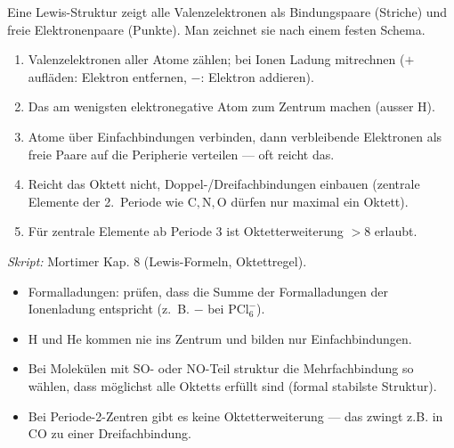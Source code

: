 
Eine Lewis-Struktur zeigt alle Valenzelektronen als Bindungspaare (Striche) und
freie Elektronenpaare (Punkte). Man zeichnet sie nach einem festen Schema.

\begin{werkzeugkasten}
\begin{enumerate}
  \item Valenzelektronen aller Atome zählen; bei Ionen Ladung mitrechnen
        ($+$ aufläden: Elektron entfernen, $-$: Elektron addieren).
  \item Das am wenigsten elektronegative Atom zum Zentrum machen (ausser H).
  \item Atome über Einfachbindungen verbinden, dann verbleibende Elektronen als
        freie Paare auf die Peripherie verteilen --- oft reicht das.
  \item        Reicht das Oktett nicht, Doppel-/Dreifachbindungen einbauen (zentrale
        Elemente der 2.\ Periode wie $\mathrm{C,N,O}$ dürfen nur maximal ein Oktett).
  \item Für zentrale Elemente ab Periode 3 ist Oktetterweiterung $>8$ erlaubt.
\end{enumerate}
\textit{Skript:} Mortimer Kap. 8 (Lewis-Formeln, Oktettregel).
\end{werkzeugkasten}

\begin{achtung}
\begin{itemize}
  \item Formalladungen: prüfen, dass die Summe der Formalladungen der
        Ionenladung entspricht (z.\ B. $\mathrm{-}$ bei $\mathrm{PCl_6^-}$).
  \item H und He kommen nie ins Zentrum und bilden nur Einfachbindungen.
  \item Bei Molekülen mit $\mathrm{SO}$- oder $\mathrm{NO}$-Teil struktur die
        Mehrfachbindung so wählen, dass möglichst alle Oktetts erfüllt sind
        (formal stabilste Struktur).
  \item Bei Periode-2-Zentren gibt es keine Oktetterweiterung --- das zwingt z.B.
        in $\mathrm{CO}$ zu einer Dreifachbindung.
\end{itemize}
\end{achtung}
